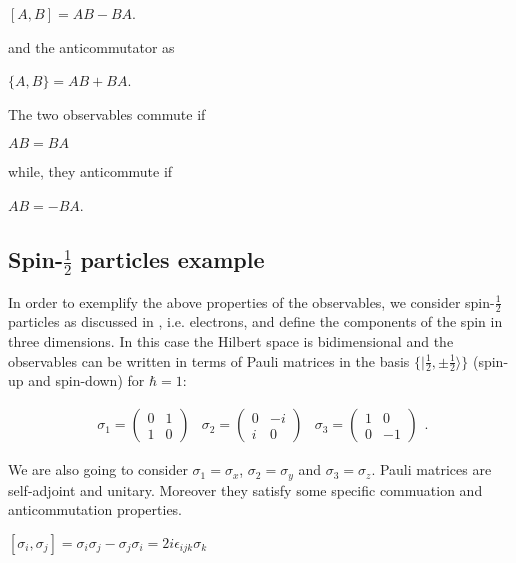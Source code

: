 \documentclass{Configuration_Files/PoliMi3i_thesis}
\begin{document}
\begin{center}
	$[A, B] = AB - BA$.
\end{center}

and the anticommutator as

\begin{center}
	$\{A,B\} = AB + BA$.
\end{center}

The two observables commute if

\begin{center}
	$AB = BA$
\end{center}

while, they anticommute if 

\begin{center}
	$AB = - BA$. 
\end{center}


\subsection{Spin-$\frac{1}{2}$ particles example}

In order to exemplify the above properties of the observables, we consider spin-$\frac{1}{2}$ particles {as discussed in \cite{Cor23}}, i.e. electrons, and define the components of the spin in three dimensions. In this case the Hilbert space is bidimensional and the observables can be written in terms of Pauli matrices in the basis $\{ | \frac{1}{2}, \pm \frac{1}{2} \rangle \}$ (spin-up and spin-down) for $\hbar=1$:


\[
\begin{array}{ccc}
	\text{$\sigma_1$} = 
	\begin{pmatrix}
		0 & 1 \\
		1 & 0
	\end{pmatrix} &
	\text{$\sigma_2$} = 
	\begin{pmatrix}
		0 & -i \\
		i & 0
	\end{pmatrix} &
	\text{$\sigma_3$} = 
	\begin{pmatrix}
		1 & 0 \\
		0 & -1
	\end{pmatrix}
\end{array}.
\]

We are also going to consider $\sigma_1=\sigma_x$, $\sigma_2=\sigma_y$ and $\sigma_3=\sigma_z$.
Pauli matrices are self-adjoint and unitary. Moreover they satisfy some specific commuation and anticommutation properties.


\begin{center}
	$[\sigma_i, \sigma_j] = \sigma_i \sigma_j - \sigma_j \sigma_i 
	= 2i\epsilon_{ijk} \sigma_k$
\end{center}
\end{document}
